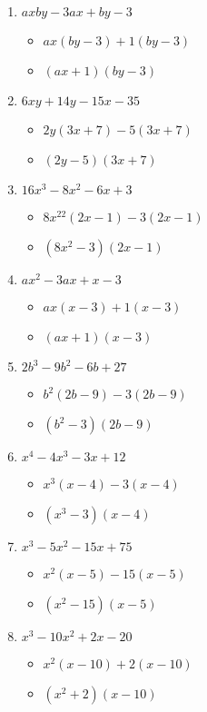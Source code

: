 \documentclass{article}
\begin{document}
\begin{enumerate}
\begin{itemize}
  \end{itemize}
\item $axby - 3ax + by - 3$
  \begin{itemize}
  \item $ax(by-3)+1(by-3)$
  \item $(ax+1)(by-3)$
  \end{itemize}
\item $6xy + 14y - 15x - 35$
  \begin{itemize}
  \item $2y(3x+7)-5(3x+7)$
  \item $(2y-5)(3x+7)$
  \end{itemize}
\item $16x^{3} - 8x^{2} - 6x + 3$
  \begin{itemize}
  \item $8x^{22}(2x-1)-3(2x-1)$
  \item $(8x^{2}-3)(2x-1)$
  \end{itemize}
\item $ax^{2} - 3ax + x - 3$
  \begin{itemize}
  \item $ax(x-3)+1(x-3)$
  \item $(ax+1)(x-3)$
  \end{itemize}
\item $2b^{3} - 9b^{2} - 6b + 27$
  \begin{itemize}
  \item $b^{2}(2b-9)-3(2b-9)$
  \item $(b^{2}-3)(2b-9)$
  \end{itemize}
\item $x^{4} - 4x^{3} - 3x + 12$
  \begin{itemize}
  \item $x^{3}(x-4)-3(x-4)$
  \item $(x^{3}-3)(x-4)$
  \end{itemize}
\item $x^{3} - 5x^{2} - 15x + 75$
  \begin{itemize}
  \item $x^{2}(x-5)-15(x-5)$
  \item $(x^{2}-15)(x-5)$
  \end{itemize}
\item $x^{3} - 10x^{2} + 2x - 20$
  \begin{itemize}
  \item $x^{2}(x-10)+2(x-10)$
  \item $(x^{2}+2)(x-10)$

\end{itemize}
\end{enumerate}
\end{document}
